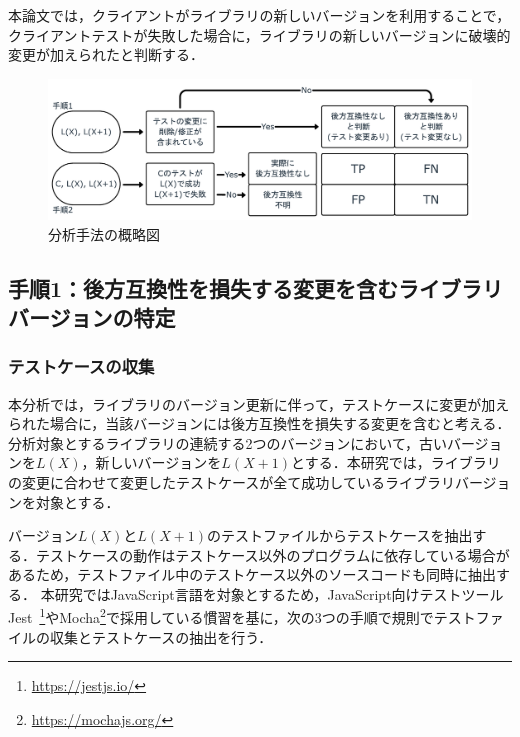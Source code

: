 \documentclass[submit]{ipsj}
\begin{document}
本論文では，クライアントがライブラリの新しいバージョンを利用することで，クライアントテストが失敗した場合に，ライブラリの新しいバージョンに破壊的変更が加えられたと判断する．

\begin{figure}[t]
  \centering
  \includegraphics[width=0.95\linewidth]{IPSJjournal_maekawa_fig/overview.pdf}
  \caption{分析手法の概略図}
  \label{fig:overview}
\end{figure}

\subsection{手順1：後方互換性を損失する変更を含むライブラリバージョンの特定}
\label{sec:step1}

\subsubsection{テストケースの収集}
\label{sec:step1-1}

本分析では，ライブラリのバージョン更新に伴って，テストケースに変更が加えられた場合に，当該バージョンには後方互換性を損失する変更を含むと考える．分析対象とするライブラリの連続する2つのバージョンにおいて，古いバージョンを$L(X)$，新しいバージョンを$L(X+1)$とする．本研究では，ライブラリの変更に合わせて変更したテストケースが全て成功しているライブラリバージョンを対象とする．

バージョン$L(X)$と$L(X+1)$のテストファイルからテストケースを抽出する．テストケースの動作はテストケース以外のプログラムに依存している場合があるため，テストファイル中のテストケース以外のソースコードも同時に抽出する．
本研究ではJavaScript言語を対象とするため，JavaScript向けテストツールJest~\footnote{\url{https://jestjs.io/}}やMocha\footnote{\url{https://mochajs.org/}}で採用している慣習を基に，次の3つの手順で規則でテストファイルの収集とテストケースの抽出を行う．
\end{document}
